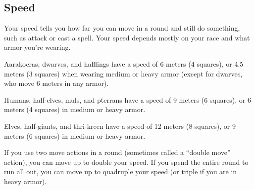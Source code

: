 \subsection{Speed}
Your speed tells you how far you can move in a round and still do something, such as attack or cast a spell. Your speed depends mostly on your race and what armor you're wearing.

Aarakocras, dwarves, and halflings have a speed of 6 meters (4 squares), or 4.5 meters (3 squares) when wearing medium or heavy armor (except for dwarves, who move 6 meters in any armor).

Humans, half-elves, muls, and pterrans have a speed of 9 meters (6 squares), or 6 meters (4 squares) in medium or heavy armor.

Elves, half-giants, and thri-kreen have a speed of 12 meters (8 squares), or 9 meters (6 squares) in medium or heavy armor.

If you use two move actions in a round (sometimes called a ``double move'' action), you can move up to double your speed. If you spend the entire round to run all out, you can move up to quadruple your speed (or triple if you are in heavy armor).